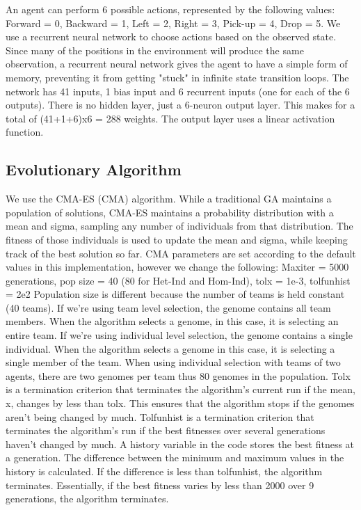 \documentclass[12pt]{article}  %
\begin{document}
An agent can perform 6 possible actions, represented by the following values: Forward = 0, Backward = 1, Left = 2, Right = 3, Pick-up = 4, Drop = 5.
We use a recurrent neural network to choose actions based on the observed state.
Since many of the positions in the environment will produce the same observation, a recurrent neural network gives the agent to have a simple form of memory, preventing it from getting "stuck" in infinite state transition loops.
The network has 41 inputs, 1 bias input and 6 recurrent inputs (one for each of the 6 outputs). 
There is no hidden layer, just a 6-neuron output layer. 
This makes for a total of (41+1+6)x6 = 288 weights. 
The output layer uses a linear activation function.

\subsection{Evolutionary Algorithm}

We use the CMA-ES (CMA) algorithm. 
While a traditional GA maintains a population of solutions, CMA-ES maintains a probability distribution with a mean and sigma, sampling any number of individuals from that distribution. 
The fitness of those individuals is used to update the mean and sigma, while keeping track of the best solution so far. 
CMA parameters are set according to the default values in this implementation, however we change the following:
Maxiter = 5000 generations, pop size = 40 (80 for Het-Ind and Hom-Ind), tolx = 1e-3, tolfunhist = 2e2
Population size is different because the number of teams is held constant (40 teams). 
If we're using team level selection, the genome contains all team members. 
When the algorithm selects a genome, in this case, it is selecting an entire team.
If we're using individual level selection, the genome contains a single individual. 
When the algorithm selects a genome in this case, it is selecting a single member of the team. 
When using individual selection with teams of two agents, there are two genomes per team thus 80 genomes in the population.
Tolx is a termination criterion that terminates the algorithm's current run if the mean, x, changes by less than tolx. 
This ensures that the algorithm stops if the genomes aren’t being changed by much. 
Tolfunhist is a termination criterion that terminates the algorithm's run if the best fitnesses over several generations haven't changed by much. 
A history variable in the code stores the best fitness at a generation. 
The difference between the minimum and maximum values in the history is calculated. 
If the difference is less than tolfunhist, the algorithm terminates. 
Essentially, if the best fitness varies by less than 2000 over 9 generations, the algorithm terminates.\\
 
\end{document}
